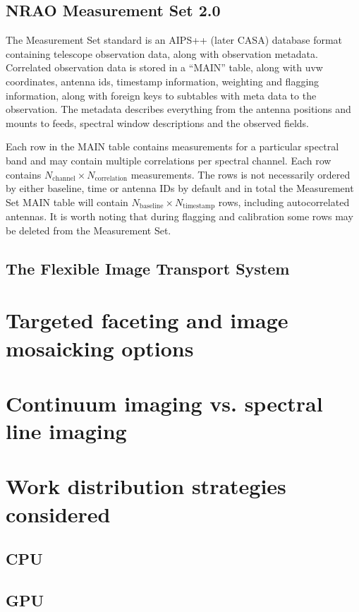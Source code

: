 \subsection{NRAO Measurement Set 2.0}
The Measurement Set standard \cite{ms10,ms20} is an AIPS++ (later CASA) database format containing telescope observation data, 
along with observation metadata. Correlated observation data is stored in a ``MAIN'' table, along with uvw coordinates, antenna ids, 
timestamp information, weighting and flagging information, along with foreign keys to subtables with meta data to the observation. The 
metadata describes everything from the antenna positions and mounts to feeds, spectral window descriptions and the observed fields.

Each row in the MAIN table contains measurements for a particular spectral band and may contain multiple correlations per spectral channel. Each
row contains $N_\text{channel}\times N_\text{correlation}$ measurements. The rows is not necessarily 
ordered by either baseline, time or antenna IDs by default and in total the Measurement Set MAIN table
will contain $N_\text{baseline}\times N_\text{timestamp}$ rows, including autocorrelated antennas. It is worth noting 
that during flagging and calibration some rows may be deleted from the Measurement Set.

\subsection{The Flexible Image Transport System}
\section{Targeted faceting and image mosaicking options}
\section{Continuum imaging vs. spectral line imaging}
\section{Work distribution strategies considered}
\subsection{CPU}
\subsection{GPU}